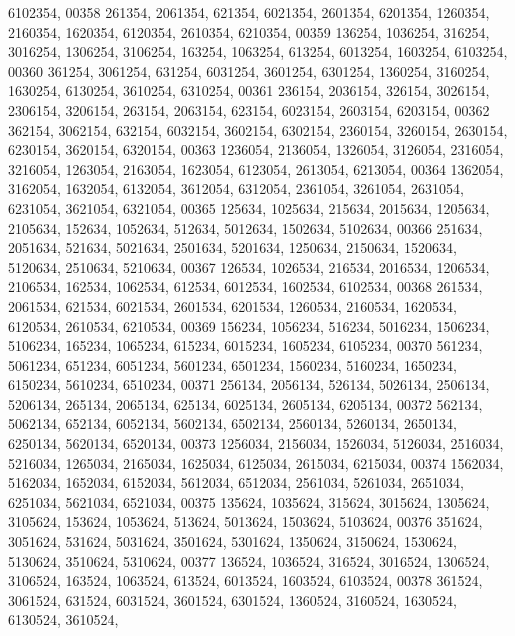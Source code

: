 \begin{DoxyCode}
      6102354,
00358        261354, 2061354,  621354, 6021354, 2601354, 6201354, 1260354, 2160354, 1620354, 6120354, 2610354, 
      6210354,
00359        136254, 1036254,  316254, 3016254, 1306254, 3106254,  163254, 1063254,  613254, 6013254, 1603254, 
      6103254,
00360        361254, 3061254,  631254, 6031254, 3601254, 6301254, 1360254, 3160254, 1630254, 6130254, 3610254, 
      6310254,
00361        236154, 2036154,  326154, 3026154, 2306154, 3206154,  263154, 2063154,  623154, 6023154, 2603154, 
      6203154,
00362        362154, 3062154,  632154, 6032154, 3602154, 6302154, 2360154, 3260154, 2630154, 6230154, 3620154, 
      6320154,
00363       1236054, 2136054, 1326054, 3126054, 2316054, 3216054, 1263054, 2163054, 1623054, 6123054, 2613054, 
      6213054,
00364       1362054, 3162054, 1632054, 6132054, 3612054, 6312054, 2361054, 3261054, 2631054, 6231054, 3621054, 
      6321054,
00365        125634, 1025634,  215634, 2015634, 1205634, 2105634,  152634, 1052634,  512634, 5012634, 1502634, 
      5102634,
00366        251634, 2051634,  521634, 5021634, 2501634, 5201634, 1250634, 2150634, 1520634, 5120634, 2510634, 
      5210634,
00367        126534, 1026534,  216534, 2016534, 1206534, 2106534,  162534, 1062534,  612534, 6012534, 1602534, 
      6102534,
00368        261534, 2061534,  621534, 6021534, 2601534, 6201534, 1260534, 2160534, 1620534, 6120534, 2610534, 
      6210534,
00369        156234, 1056234,  516234, 5016234, 1506234, 5106234,  165234, 1065234,  615234, 6015234, 1605234, 
      6105234,
00370        561234, 5061234,  651234, 6051234, 5601234, 6501234, 1560234, 5160234, 1650234, 6150234, 5610234, 
      6510234,
00371        256134, 2056134,  526134, 5026134, 2506134, 5206134,  265134, 2065134,  625134, 6025134, 2605134, 
      6205134,
00372        562134, 5062134,  652134, 6052134, 5602134, 6502134, 2560134, 5260134, 2650134, 6250134, 5620134, 
      6520134,
00373       1256034, 2156034, 1526034, 5126034, 2516034, 5216034, 1265034, 2165034, 1625034, 6125034, 2615034, 
      6215034,
00374       1562034, 5162034, 1652034, 6152034, 5612034, 6512034, 2561034, 5261034, 2651034, 6251034, 5621034, 
      6521034,
00375        135624, 1035624,  315624, 3015624, 1305624, 3105624,  153624, 1053624,  513624, 5013624, 1503624, 
      5103624,
00376        351624, 3051624,  531624, 5031624, 3501624, 5301624, 1350624, 3150624, 1530624, 5130624, 3510624, 
      5310624,
00377        136524, 1036524,  316524, 3016524, 1306524, 3106524,  163524, 1063524,  613524, 6013524, 1603524, 
      6103524,
00378        361524, 3061524,  631524, 6031524, 3601524, 6301524, 1360524, 3160524, 1630524, 6130524, 3610524, 

\end{DoxyCode}

